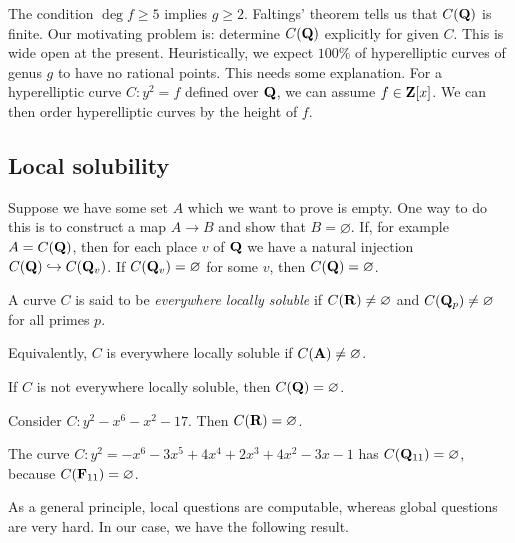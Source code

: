 The condition $\deg f\geqslant 5$ implies $g\geqslant 2$. Faltings' theorem 
tells us that $C(\mathbf{Q})$ is finite. Our motivating problem is: determine 
$C(\mathbf{Q})$ explicitly for given $C$. This is wide open at the present. 
Heuristically, we expect $100\%$ of hyperelliptic curves of genus $g$ to have 
no rational points. This needs some explanation. For a hyperelliptic curve 
$C:y^2=f$ defined over $\mathbf{Q}$, we can assume $f\in \mathbf{Z}[x]$. We can then order 
hyperelliptic curves by the height of $f$. 





\subsection{Local solubility}

Suppose we have some set $A$ which we want to prove is empty. One way to 
do this is to construct a map $A\to B$ and show that $B=\varnothing$. If, for 
example $A=C(\mathbf{Q})$, then for each place $v$ of $\mathbf{Q}$ we have a natural 
injection $C(\mathbf{Q})\hookrightarrow C(\mathbf{Q}_v)$. If $C(\mathbf{Q}_v)=\varnothing$ for 
some $v$, then $C(\mathbf{Q})=\varnothing$. 

\begin{defi}
A curve $C$ is said to be \emph{everywhere locally soluble} if 
$C(\mathbf{R})\ne\varnothing$ and $C(\mathbf{Q}_p)\ne\varnothing$ for all primes $p$. 
\end{defi}

Equivalently, $C$ is everywhere locally soluble if $C(\mathbf{A})\ne\varnothing$. 

\begin{theo}
If $C$ is not everywhere locally soluble, then $C(\mathbf{Q})=\varnothing$. 
\end{theo}

\begin{example}
Consider $C:y^2-x^6-x^2-17$. Then $C(\mathbf{R})=\varnothing$. 
\end{example}

\begin{example}
The curve $C:y^2=-x^6-3 x^5+4 x^4+2 x^3 +4 x^2 - 3 x-1$ has 
$C(\mathbf{Q}_{11})=\varnothing$, because $C(\mathbf{F}_{11})=\varnothing$. 
\end{example}

As a general principle, local questions are computable, whereas global 
questions are very hard. In our case, we have the following result. 

